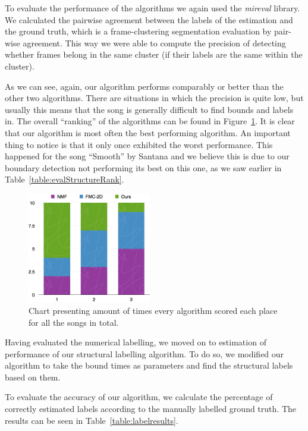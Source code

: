 To evaluate the performance of the algorithms we again used the \textit{mir\textunderscore eval} library. We calculated the pairwise agreement between the labels of the estimation and the ground truth, which is a frame-clustering segmentation evaluation by pair-wise agreement. This way we were able to compute the precision of detecting whether frames belong in the same cluster (if their labels are the same within the cluster).

As we can see, again, our algorithm performs comparably or better than the other two algorithms. There are situations in which the precision is quite low, but usually this means that the song is generally difficult to find bounds and labels in. The overall ``ranking'' of the algorithms can be found in Figure~\ref{fig:labelrank}. It is clear that our algorithm is most often the best performing algorithm. An important thing to notice is that it only once exhibited the worst performance. This happened for the song ``Smooth'' by Santana and we believe this is due to our boundary detection not performing its best on this one, as we saw earlier in Table~\ref{table:evalStructureRank}.

\begin{figure}
\vspace{-30pt}
  \begin{center}
    \includegraphics[width=0.48\textwidth]{Figures/labellingdistribution}
  \end{center}
  \caption{Chart presenting amount of times every algorithm scored each place for all the songs in total.}
\label{fig:labelrank}
\end{figure}

Having evaluated the numerical labelling, we moved on to estimation of performance of our structural labelling algorithm. To do so, we modified our algorithm to take the bound times as parameters and find the structural labels based on them. 

To evaluate the accuracy of our algorithm, we calculate the percentage of correctly estimated labels according to the manually labelled ground truth. The results can be seen in Table~\ref{table:labelresults}. 

